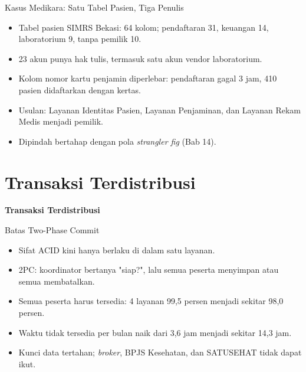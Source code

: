 \documentclass[aspectratio=169, table, 12pt]{beamer}
\begin{document}
\begin{frame}{{\Large Kasus Medikara: Satu Tabel Pasien, Tiga Penulis}}
  \vspace{6pt}
  \small
  \begin{itemize}
    \item Tabel pasien SIMRS Bekasi: 64 kolom; pendaftaran 31, keuangan 14,
          laboratorium 9, tanpa pemilik 10.
    \item 23 akun punya hak tulis, termasuk satu akun vendor laboratorium.
    \item Kolom nomor kartu penjamin diperlebar: pendaftaran gagal 3 jam, 410
          pasien didaftarkan dengan kertas.
    \item Usulan: Layanan Identitas Pasien, Layanan Penjaminan, dan Layanan
          Rekam Medis menjadi pemilik.
    \item Dipindah bertahap dengan pola \textit{strangler fig} (Bab 14).
  \end{itemize}
\end{frame}

\section{Transaksi Terdistribusi}

\begin{frame}{\hfill}
  \centering
  \Huge{\textbf{Transaksi Terdistribusi}}
\end{frame}

\begin{frame}{{\Large Batas Two-Phase Commit}}
  \vspace{6pt}
  \small
  \begin{itemize}
    \item Sifat ACID kini hanya berlaku di dalam satu layanan.
    \item 2PC: koordinator bertanya "siap?", lalu semua peserta menyimpan atau
          semua membatalkan.
    \item Semua peserta harus tersedia: 4 layanan 99,5 persen menjadi sekitar
          98,0 persen.
    \item Waktu tidak tersedia per bulan naik dari 3,6 jam menjadi sekitar 14,3
          jam.
    \item Kunci data tertahan; \textit{broker}, BPJS Kesehatan, dan SATUSEHAT
          tidak dapat ikut.
  \end{itemize}
\end{frame}
\end{document}
